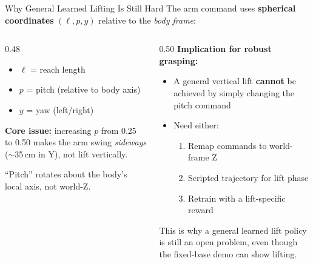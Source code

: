 \documentclass[10pt,aspectratio=169]{beamer}
\begin{document}
\begin{frame}{Why General Learned Lifting Is Still Hard}
  The arm command uses \textbf{spherical coordinates} $(\ell, p, y)$
  relative to the \emph{body frame}:
  \begin{columns}[T]
    \begin{column}{0.48\textwidth}
      \begin{itemize}
        \item $\ell$ = reach length
        \item $p$ = pitch (relative to body axis)
        \item $y$ = yaw (left/right)
      \end{itemize}

      \vspace{6pt}
      \textbf{Core issue:} increasing $p$ from 0.25 to 0.50
      makes the arm swing \emph{sideways}
      ($\sim$35\,cm in Y), not lift vertically.

      \vspace{4pt}
      ``Pitch'' rotates about the body's local axis,
      not world-Z.
    \end{column}
    \begin{column}{0.50\textwidth}
      \textbf{Implication for robust grasping:}
      \begin{itemize}
        \item A general vertical lift \textbf{cannot} be achieved by
              simply changing the pitch command
        \item Need either:
          \begin{enumerate}
            \item Remap commands to world-frame Z
            \item Scripted trajectory for lift phase
            \item Retrain with a lift-specific reward
          \end{enumerate}
      \end{itemize}

      \vspace{4pt}
      {\small This is why a general learned lift policy is still
      an open problem, even though the fixed-base demo can show lifting.}
    \end{column}
  \end{columns}
\end{frame}
\end{document}
